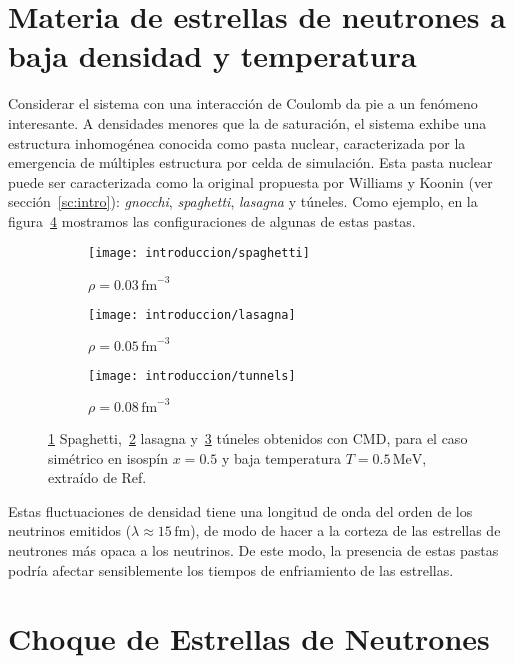 \section{Materia de estrellas de neutrones a baja densidad y temperatura}\label{sc:nsm_lowd}

Considerar el sistema con una interacción de Coulomb da pie a un fenómeno interesante.
A densidades menores que la de saturación, el sistema exhibe una estructura inhomogénea conocida como pasta nuclear, caracterizada por la emergencia de múltiples estructura por celda de simulación.
Esta pasta nuclear puede ser caracterizada como la original propuesta por Williams y Koonin (ver sección~\ref{sc:intro}): \emph{gnocchi}, \emph{spaghetti}, \emph{lasagna} y túneles.
Como ejemplo, en la figura~\ref{fig:pasta} mostramos las configuraciones de algunas de estas pastas.


\begin{figure}[h]
  \begin{subfigure}[h!]{0.48\columnwidth}
    \texttt{[image: introduccion/spaghetti]}
    \caption{$\rho = 0.03\,\text{fm}^{-3}$}
    \label{sfig:spaghetti}
  \end{subfigure}
  \begin{subfigure}[h!]{0.48\columnwidth}
    \texttt{[image: introduccion/lasagna]}
    \caption{$\rho = 0.05\,\text{fm}^{-3}$}
    \label{sfig:lasagna}
  \end{subfigure}
  \begin{subfigure}[h!]{0.48\columnwidth}
    \texttt{[image: introduccion/tunnels]}
    \caption{$\rho = 0.08\,\text{fm}^{-3}$}
    \label{sfig:tunnels}
  \end{subfigure}
  \centering
  \caption{\ref{sfig:spaghetti} Spaghetti,~\ref{sfig:lasagna} lasagna y~\ref{sfig:tunnels} túneles obtenidos con CMD, para el caso simétrico en isospín $x=0.5$ y baja temperatura $T=0.5\,\text{MeV}$, extraído de Ref.~\cite{alcain_effect_2014}}
  \label{fig:pasta}
\end{figure}

Estas fluctuaciones de densidad tiene una longitud de onda del orden de los neutrinos emitidos ($\lambda \approx 15\,\text{fm}$), de modo de hacer a la corteza de las estrellas de neutrones más opaca a los neutrinos.
De este modo, la presencia de estas pastas podría afectar sensiblemente los tiempos de enfriamiento de las estrellas.

\section{Choque de Estrellas de Neutrones}

